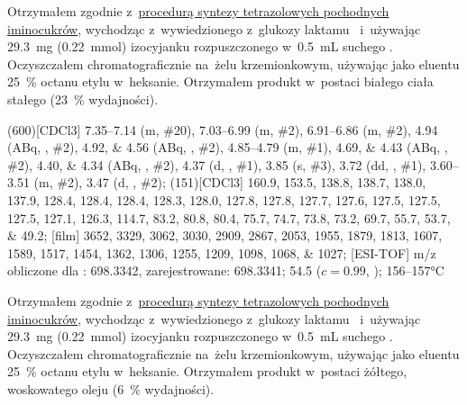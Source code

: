 Otrzymałem zgodnie z~\hyperref[experimental:sugars:schwartz]{procedurą syntezy tetrazolowych
  pochodnych iminocukrów}, wychodząc z~wywiedzionego z~glukozy laktamu~
  i~używając \SI{29.3}{\milli\gram} (\SI{0.22}{\milli\mol}) izocyjanku 
  rozpuszczonego w~\SI{0.5}{\milli\liter} suchego .
Oczyszczałem chromatograficznie na~żelu krzemionkowym,
  używając jako eluentu \SI{25}{\percent} octanu etylu w~heksanie.
Otrzymałem produkt w~postaci białego ciała stałego (\SI{23}{\percent} wydajności).

\begin{fullexp}
  \NMR(600)[CDCl3] \numrange{7.35}{7.14} (m, \#{20}), \numrange{7.03}{6.99} (m, \#{2}), \numrange{6.91}{6.86} (m, \#{2}), \num{4.94} (ABq, , \#{2}), \numlist{4.92;4.56} (ABq, , \#{2}), \numrange{4.85}{4.79} (m, \#{1}), \numlist{4.69;4.43} (ABq, , \#{2}), \numlist{4.40;4.34} (ABq, , \#{2}), \num{4.37} (d, , \#{1}), \num{3.85} (s, \#{3}), \num{3.72} (dd, , \#{1}), \numrange{3.60}{3.51} (m, \#{2}), \num{3.47} (d, , \#{2});
  (151)[CDCl3] \numlist{160.9; 153.5; 138.8; 138.7; 138.0; 137.9; 128.4; 128.4; 128.4; 128.3; 128.0; 127.8; 127.8; 127.7; 127.6; 127.5; 127.5; 127.5; 127.1; 126.3; 114.7; 83.2; 80.8; 80.4; 75.7; 74.7; 73.8; 73.2; 69.7; 55.7; 53.7; 49.2};
  [film] \numlist{3652; 3329; 3062; 3030; 2909; 2867; 2053; 1955; 1879; 1813; 1607; 1589; 1517; 1454; 1362; 1306; 1255; 1209; 1098; 1068; 1027};
  [ESI-TOF] m/z obliczone dla : \num{698.3342}, zarejestrowane: \num{698.3341};
  \data{[$\alpha^{23}_D$]~$=$} \num{54.5} ($c = 0.99$, );
   \numrange{156}{157}\si{\celsius}
\end{fullexp}

Otrzymałem zgodnie z~\hyperref[experimental:sugars:schwartz]{procedurą syntezy tetrazolowych
  pochodnych iminocukrów}, wychodząc z~wywiedzionego z~glukozy laktamu~
  i~używając \SI{29.3}{\milli\gram} (\SI{0.22}{\milli\mol}) izocyjanku 
  rozpuszczonego w~\SI{0.5}{\milli\liter} suchego .
Oczyszczałem chromatograficznie na~żelu krzemionkowym,
  używając jako eluentu \SI{25}{\percent} octanu etylu w~heksanie.
Otrzymałem produkt w~postaci żółtego, woskowatego oleju (\SI{6}{\percent} wydajności).

